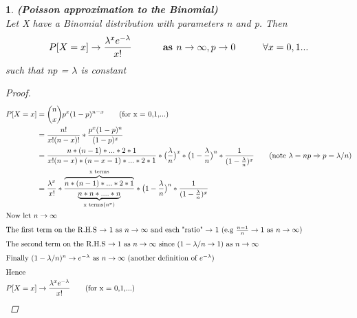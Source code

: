 \documentclass[11pt]{article}
\newtheorem{theorem}{\framebox{Thm}}[section]
\newcommand\tab[1][1cm]{\hspace*{#1}}
\begin{document}
            \begin{theorem}
                \textbf{(Poisson approximation to the Binomial)} \\
                Let X have a Binomial distribution with parameters n and p. Then 
                $$P[X=x]\rightarrow \frac{\lambda^x e^{-\lambda}}{x!} \tab \textbf{ as } n \rightarrow \infty, p \rightarrow 0 \tab \forall x = 0,1...$$
                such that np = $\lambda$ is constant

                \begin{proof}
                    \begin{align*}
                        P[X= x]     &= \binom{n}{x} p^x (1-p)^{n-x} \tag{for x = 0,1,...} \\
                                    &= \frac{n!}{x!(n-x)!}* \frac{p^x (1-p)^n}{(1-p)^x} \\
                                    &= \frac{n*(n-1)*...*2*1}{x!(n-x)*(n-x-1)*...*2*1}  * \big(\frac{\lambda}{n}\big)^x * \big(1 - \frac{\lambda}{n}\big)^n *\frac{1}{(1 - \frac{\lambda}{n})^x}    \tag{note $\lambda = np \Rightarrow p = \lambda/n$}\\
                                    &= \frac{\lambda^x}{x!} * \frac{\overbrace{n*(n-1)*...*2*1}^{\text{x terms}}}{\underbrace{n* n* ....* n}_{\text{x terms} (n^x)}} * \big(1 - \frac{\lambda}{n}\big)^n * \frac{1}{(1 - \frac{\lambda}{n})^x}  \\
                        \intertext{Now let $n \rightarrow \infty $}
                        \intertext{The first term on the R.H.S $\rightarrow$ 1 as $n \rightarrow \infty$ and each "ratio" $\rightarrow$ 1 (e.g $\frac{n-1}{n} \rightarrow 1$ as $n \rightarrow \infty$)}
                        \intertext{The second term on the R.H.S $\rightarrow 1$ as $n \rightarrow \infty$ since $(1 - \lambda/n \rightarrow 1)$ as $n \rightarrow \infty$ } 
                        \intertext{Finally $(1 - \lambda/n)^n \rightarrow e^{-\lambda}$ as $n \rightarrow \infty$ (another definition of $e^{-\lambda}$)}
                        \intertext{Hence} 
                        P[X= x]     &\rightarrow \frac{\lambda^x e^{-\lambda}}{x!} \tag{for x = 0,1,...}
                    \end{align*}
                \end{proof}
            \end{theorem}
\end{document}
